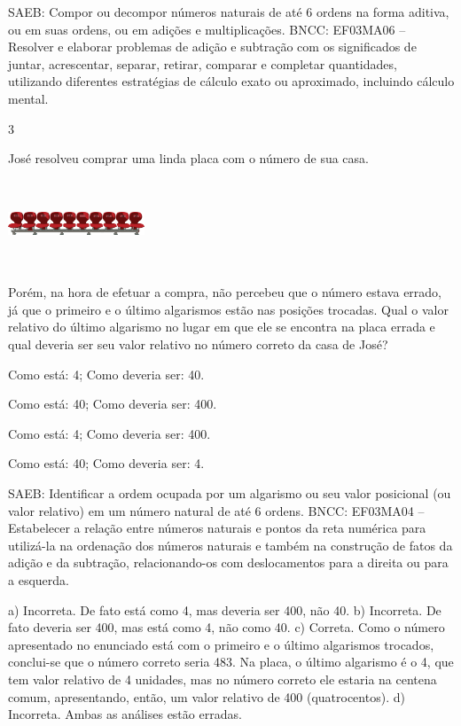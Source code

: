 \begin{escolha}
{\begin{escolha}
{SAEB: Compor ou decompor números naturais de até 6 ordens na
forma aditiva, ou em suas ordens, ou em adições e multiplicações.
BNCC: EF03MA06 – Resolver e elaborar problemas de adição e subtração com os significados de
juntar, acrescentar, separar, retirar, comparar e completar quantidades, utilizando diferentes
estratégias de cálculo exato ou aproximado, incluindo cálculo mental.


\num{3}

José resolveu comprar uma linda placa com o número de sua casa.

\includegraphics[width=1.60256in,height=1.03072in]{media/image107.png}


Porém, na hora de efetuar a compra, não percebeu que o número estava errado, já que o primeiro e o último algarismos estão nas posições
trocadas. Qual o valor relativo do último algarismo no lugar em que ele se
encontra na placa errada e qual deveria ser seu valor relativo no número correto da casa de José?

\begin{escolha}
\item
  Como está: 4; Como deveria ser: 40.
\item
  Como está: 40; Como deveria ser: 400.
\item
  Como está: 4; Como deveria ser: 400.
\item
  Como está: 40; Como deveria ser: 4.
\end{escolha}

SAEB: Identificar a ordem ocupada por um algarismo ou seu
valor posicional (ou valor relativo) em um número natural de até 6
ordens.
BNCC: EF03MA04 -- Estabelecer a relação entre números naturais e pontos da reta numérica para
utilizá-la na ordenação dos números naturais e também na construção de fatos da adição e da
subtração, relacionando-os com deslocamentos para a direita ou para a esquerda.

a) Incorreta. De fato está como 4, mas deveria ser 400, não 40.
b) Incorreta. De fato deveria ser 400, mas está como 4, não como 40.
c) Correta. Como o número apresentado no enunciado está com o primeiro e o último
algarismos trocados, conclui-se que o número correto seria 483. Na placa,
o último algarismo é o 4, que tem valor relativo de 4 unidades, mas no
número correto ele estaria na centena comum, apresentando, então, um valor
relativo de 400 (quatrocentos).
d) Incorreta. Ambas as análises estão erradas.

}
\end{escolha}}
\end{escolha}
